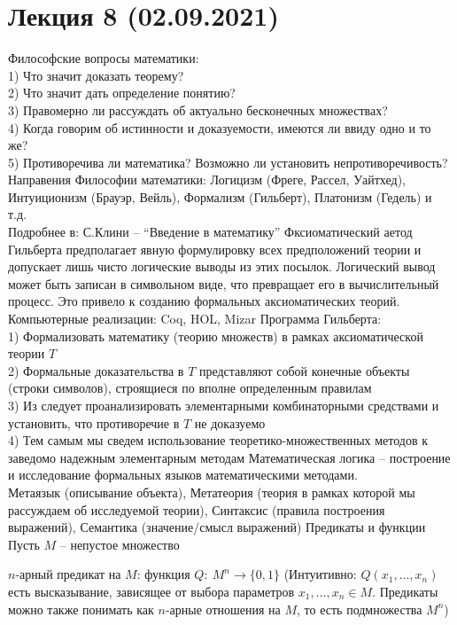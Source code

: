 \section{Лекция 8 (02.09.2021)}

Философские вопросы математики:\\
1) Что значит доказать теорему?\\
2) Что значит дать определение понятию?\\
3) Правомерно ли рассуждать об актуально бесконечных множествах?\\
4) Когда говорим об истинности и доказуемости, имеются ли ввиду одно и то же?\\
5) Противоречива ли математика? Возможно ли установить непротиворечивость?
\vskip 0.3in
Направения Философии математики: Логицизм (Фреге, Рассел, Уайтхед), Интуиционизм (Брауэр, Вейль), Формализм (Гильберт), Платонизм (Гедель) и т.д.\\
Подробнее в: С.Клини -- ``Введение в математику''
\vskip 0.2in
Фксиоматический аетод Гильберта предполагает явную формулировку всех предположений теории и допускает лишь чисто логические выводы из этих посылок.
\vskip 0.1in
Логический вывод может быть записан в символьном виде, что превращает его в вычислительный процесс. Это привело к созданию формальных аксиоматических теорий.
\vskip 0.2in
Компьютерные реализации: Coq, HOL, Mizar
\vskip 0.2in
Программа Гильберта:\\
1) Формализовать математику (теорию множеств) в рамках аксиоматической теории $T$\\
2) Формальные доказательства в $T$ представляют собой конечные объекты (строки символов), строящиеся по вполне определенным правилам\\
3) Из следует проанализировать элементарными комбинаторными средствами и установить, что противоречие в $T$ не доказуемо\\
4) Тем самым мы сведем использование теоретико-множественных методов к заведомо надежным элементарным методам
\vskip 0.2in
Математическая логика -- построение и исследование формальных языков математическими методами.\\
Метаязык (описывание объекта), Метатеория (теория в рамках которой мы рассуждаем об исследуемой теории), Синтаксис (правила построения выражений), Семантика (значение/смысл выражений)
\vskip 0.4in
Предикаты и функции\\
Пусть $M$ -- непустое множество\\
\begin{defn}
$n$-арный предикат на $M$: функция $Q:\ M^n \to \{0,1\}$ (Интуитивно: $Q(x_1, \ldots ,x_n)$ есть высказывание, зависящее от выбора параметров $x_1, \ldots, x_n \in M$. Предикаты можно также понимать как $n$-арные отношения на $M$, то есть подмножества $M^n$)
\end{defn}
